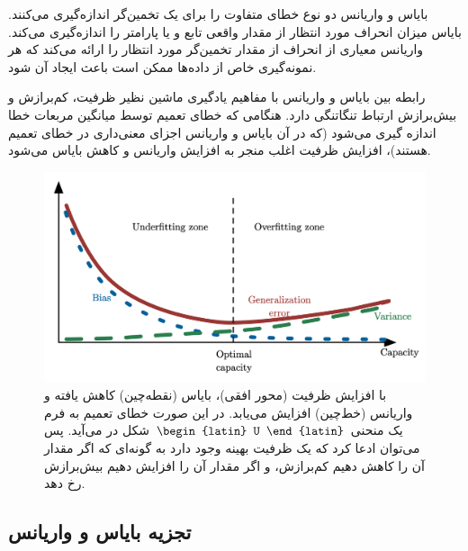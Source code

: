 بایاس و واریانس دو نوع خطای متفاوت را برای یک تخمین‌گر اندازه‌گیری می‌کنند. بایاس میزان انحراف مورد انتظار از مقدار واقعی تابع و یا پارامتر را اندازه‌گیری می‌کند. واریانس معیاری از انحراف از مقدار تخمین‌گر مورد انتظار را ارائه می‌کند که هر نمونه‌گیری خاص از داده‌ها ممکن است باعث ایجاد آن شود. 

رابطه بین بایاس و واریانس با مفاهیم یادگیری ماشین نظیر ظرفیت، کم‌برازش و بیش‌برازش ارتباط تنگاتنگی دارد.
هنگامی که خطای تعمیم توسط میانگین مربعات خطا اندازه گیری می‌شود (که در آن بایاس و واریانس اجزای معنی‌داری در خطای تعمیم هستند)، افزایش ظرفیت اغلب منجر به افزایش واریانس و کاهش بایاس می‌شود.

\begin{figure}
    \centering
    \includegraphics[width=\textwidth]{figs/Bias-Variance.png}
    \caption{با افزایش ظرفیت (محور افقی)، بایاس (نقطه‌چین) کاهش یافته و واریانس (خط‌چین) افزایش می‌یابد. در این صورت خطای تعمیم به فرم یک منحنی $\text{\begin{latin}
        U
    \end{latin}}$ شکل در می‌آید. پس می‌توان ادعا کرد که یک ظرفیت بهینه وجود دارد به گونه‌ای که اگر مقدار آن را کاهش دهیم کم‌برازش، و اگر مقدار آن را افزایش دهیم بیش‌برازش رخ دهد.}
    \label{fig:Bias_Var}
\end{figure}


\subsection{تجزیه بایاس و واریانس}

